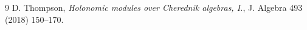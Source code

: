 \documentclass[12pt, a4paper]{amsart}
\begin{document}
\begin{thebibliography}{9}
{\sc D. Thompson},
{\em Holonomic modules over Cherednik algebras, I.},
J. Algebra 493 (2018) 150--170.

\end{thebibliography}
\end{document}
